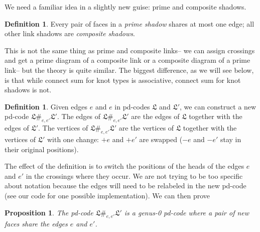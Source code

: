 \documentclass[amsmath,secnumarabic,floatfix,amssymb,nofootinbib,nobibnotes,letterpaper,11pt,tightenlines,showkeys]{revtex4}
\newtheorem{proposition}[theorem]{Proposition}
\theoremstyle{definition}
\newtheorem{definition}[theorem]{Definition}
\begin{document}
We need a familiar idea in a slightly new guise: prime and composite shadows.
\begin{definition}
Every pair of faces in a \emph{prime shadow} shares at most one edge; all other link shadows are \emph{composite shadows}.
\end{definition}
This is not the same thing as prime and composite links-- we can assign crossings and get a prime diagram of a composite link or a composite diagram of a prime link-- but the theory is quite similar. The biggest difference, as we will see below, is that while connect sum for knot types is associative, connect sum for knot shadows is not.

\begin{definition}
Given edges $e$ and $e$ in pd-codes $\mathfrak{L}$ and $\mathfrak{L}'$, we can construct a new pd-code $\mathfrak{L} \#_{e,e'} \mathfrak{L'}$. The edges of $\mathfrak{L} \#_{e,e'} \mathfrak{L'}$ are the edges of $\mathfrak{L}$ together with the edges of $\mathfrak{L'}$. The vertices of $\mathfrak{L} \#_{e,e'} \mathfrak{L'}$ are the vertices of $\mathfrak{L}$ together with the vertices of $\mathfrak{L'}$ with one change: $+e$ and $+e'$ are swapped ($-e$ and $-e'$ stay in their original positions).
\end{definition}
The effect of the definition is to switch the positions of the heads of the edges $e$ and $e'$ in the crossings where they occur. We are not trying to be too specific about notation because the edges will need to be relabeled in the new pd-code (see our code for one possible implementation).
We can then prove
\begin{proposition}
The pd-code $\mathfrak{L} \#_{e,e'} \mathfrak{L'}$ is a genus-0 pd-code where a pair of new faces share the edges $e$ and $e'$.
\end{proposition}
\end{document}
